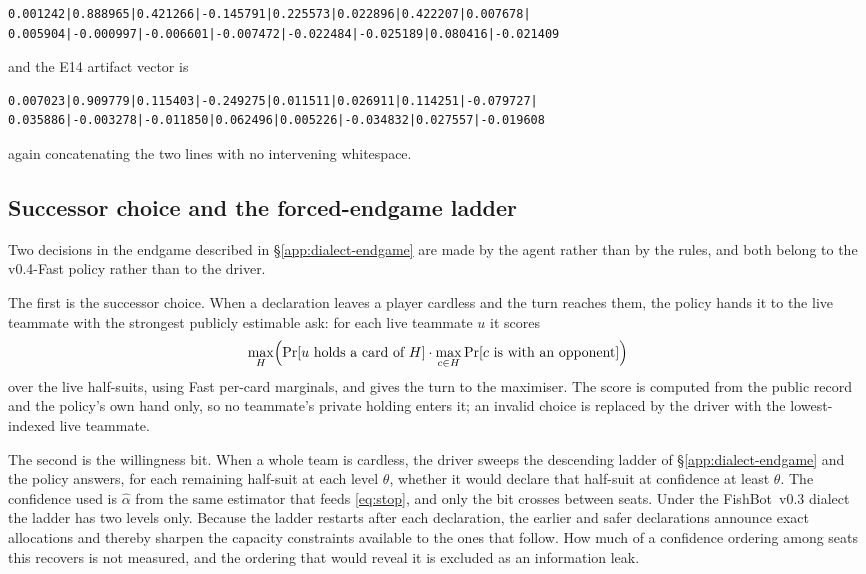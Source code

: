\documentclass[11pt]{article}
\theoremstyle{definition}
\DeclareRobustCommand{\vfast}{\texorpdfstring{\mbox{v0.4-Fast}}{v0.4-Fast}}
\DeclareRobustCommand{\vthree}{\texorpdfstring{\mbox{FishBot v0.3}}{FishBot v0.3}}
\begin{document}
{\footnotesize
\begin{verbatim}
0.001242|0.888965|0.421266|-0.145791|0.225573|0.022896|0.422207|0.007678|
0.005904|-0.000997|-0.006601|-0.007472|-0.022484|-0.025189|0.080416|-0.021409
\end{verbatim}
}

\noindent and the E14 artifact vector is

{\footnotesize
\begin{verbatim}
0.007023|0.909779|0.115403|-0.249275|0.011511|0.026911|0.114251|-0.079727|
0.035886|-0.003278|-0.011850|0.062496|0.005226|-0.034832|0.027557|-0.019608
\end{verbatim}
}

\noindent again concatenating the two lines with no intervening whitespace.

\subsection{Successor choice and the forced-endgame ladder}
\label{app:params-endgame}

Two decisions in the endgame described in \S\ref{app:dialect-endgame} are made by
the agent rather than by the rules, and both belong to the \vfast{} policy rather
than to the driver.

The first is the successor choice. When a declaration leaves a player cardless
and the turn reaches them, the policy hands it to the live teammate with the
strongest publicly estimable ask: for each live teammate $u$ it scores
\[
  \max_{H} \Bigl( \Pr[u \text{ holds a card of } H] \cdot
  \max_{c \in H} \Pr[c \text{ is with an opponent}] \Bigr)
\]
over the live half-suits, using Fast per-card marginals, and gives the turn to
the maximiser. The score is computed from the public record and the policy's own
hand only, so no teammate's private holding enters it; an invalid choice is
replaced by the driver with the lowest-indexed live teammate.

The second is the willingness bit. When a whole team is cardless, the driver
sweeps the descending ladder of \S\ref{app:dialect-endgame} and the policy
answers, for each remaining half-suit at each level $\theta$, whether it would
declare that half-suit at confidence at least $\theta$. The confidence used is
$\hat\alpha$ from the same estimator that feeds \eqref{eq:stop}, and only the bit
crosses between seats. Under the \vthree{} dialect the ladder has two levels
only. Because the ladder restarts after each declaration, the earlier and safer
declarations announce exact allocations and thereby sharpen the capacity
constraints available to the ones that follow. How much of a confidence ordering
among seats this recovers is not measured, and the ordering that would reveal it
is excluded as an information leak.
\end{document}
